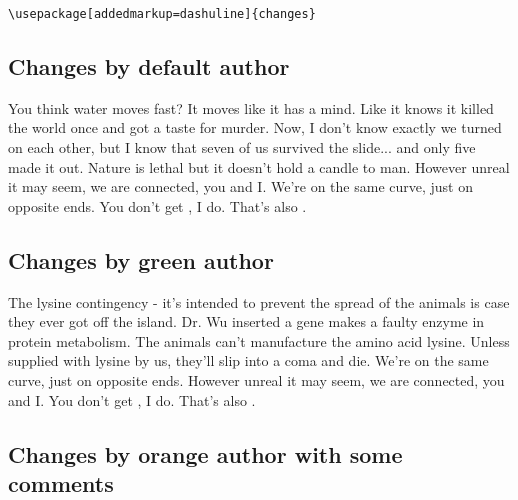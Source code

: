 \documentclass[11pt, a4paper, notitlepage, english]{article}
\begin{document}
\verb|\usepackage[addedmarkup=dashuline]{changes}|



















\subsection*{Changes by default author}

You think water moves fast?
It moves like it has a mind.
Like it knows it killed the world once and got a taste for murder.
Now, I don't know exactly  we turned on each other, but I know that seven of us survived the slide... and only five made it out.
Nature is lethal but it doesn't hold a candle to man.
However unreal it may seem, we are connected, you and I.
We're on the same curve, just on opposite ends.
You don't get , I do.
That's also .

\subsection*{Changes by green author}

The lysine contingency - it's intended to prevent the spread of the animals is case they ever got off the island.
Dr. Wu inserted a gene  makes a  faulty enzyme in protein metabolism.
The animals can't manufacture the amino acid lysine.
Unless  supplied with lysine by us, they'll slip into a coma and die.
We're on the same curve, just on opposite ends.
However unreal it may seem, we are connected, you and I.
You don't get , I do.
That's also .

\subsection*{Changes by orange author with some comments}
\end{document}
